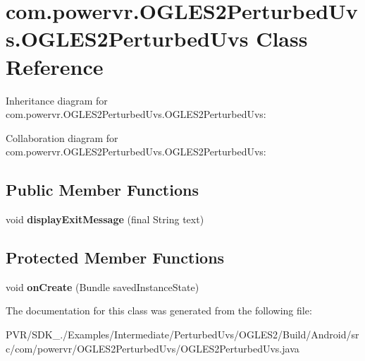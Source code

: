 \hypertarget{classcom_1_1powervr_1_1_o_g_l_e_s2_perturbed_uvs_1_1_o_g_l_e_s2_perturbed_uvs}{\section{com.\+powervr.\+O\+G\+L\+E\+S2\+Perturbed\+Uvs.\+O\+G\+L\+E\+S2\+Perturbed\+Uvs Class Reference}
\label{classcom_1_1powervr_1_1_o_g_l_e_s2_perturbed_uvs_1_1_o_g_l_e_s2_perturbed_uvs}
}


Inheritance diagram for com.\+powervr.\+O\+G\+L\+E\+S2\+Perturbed\+Uvs.\+O\+G\+L\+E\+S2\+Perturbed\+Uvs\+:


Collaboration diagram for com.\+powervr.\+O\+G\+L\+E\+S2\+Perturbed\+Uvs.\+O\+G\+L\+E\+S2\+Perturbed\+Uvs\+:
\subsection*{Public Member Functions}
\begin{DoxyCompactItemize}
\item 
\hypertarget{classcom_1_1powervr_1_1_o_g_l_e_s2_perturbed_uvs_1_1_o_g_l_e_s2_perturbed_uvs_ad4f4e87adc06ca4b0f182e7168414ed3}{void {\bfseries display\+Exit\+Message} (final String text)}\label{classcom_1_1powervr_1_1_o_g_l_e_s2_perturbed_uvs_1_1_o_g_l_e_s2_perturbed_uvs_ad4f4e87adc06ca4b0f182e7168414ed3}

\end{DoxyCompactItemize}
\subsection*{Protected Member Functions}
\begin{DoxyCompactItemize}
\item 
\hypertarget{classcom_1_1powervr_1_1_o_g_l_e_s2_perturbed_uvs_1_1_o_g_l_e_s2_perturbed_uvs_a1e788780338e14499245dad91fb05939}{void {\bfseries on\+Create} (Bundle saved\+Instance\+State)}\label{classcom_1_1powervr_1_1_o_g_l_e_s2_perturbed_uvs_1_1_o_g_l_e_s2_perturbed_uvs_a1e788780338e14499245dad91fb05939}

\end{DoxyCompactItemize}


The documentation for this class was generated from the following file\+:\begin{DoxyCompactItemize}
\item 
P\+V\+R/\+S\+D\+K\+\_./\+Examples/\+Intermediate/\+Perturbed\+Uvs/\+O\+G\+L\+E\+S2/\+Build/\+Android/src/com/powervr/\+O\+G\+L\+E\+S2\+Perturbed\+Uvs/O\+G\+L\+E\+S2\+Perturbed\+Uvs.\+java\end{DoxyCompactItemize}
